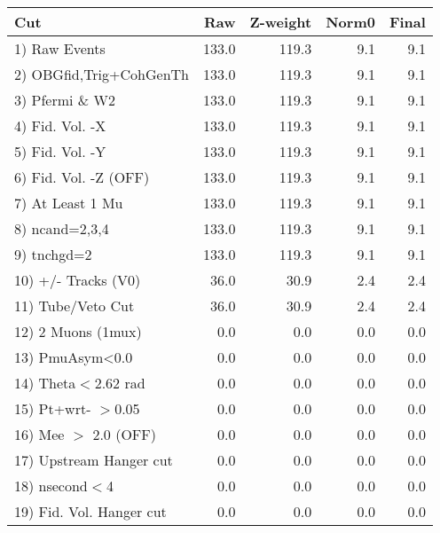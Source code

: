  \begin{table}[h!]\centering
 \begin{tabular}{||l||r|r|r|r||}
 \hline
 \hline
 Cut & Raw & Z-weight & Norm0 & Final \\
 \hline
  1) Raw Events           &       133.0 &       119.3 &         9.1 &         9.1 \\
  2) OBGfid,Trig+CohGenTh &       133.0 &       119.3 &         9.1 &         9.1 \\
  3) Pfermi \& W2         &       133.0 &       119.3 &         9.1 &         9.1 \\
  4) Fid. Vol. -X         &       133.0 &       119.3 &         9.1 &         9.1 \\
  5) Fid. Vol. -Y         &       133.0 &       119.3 &         9.1 &         9.1 \\
  6) Fid. Vol. -Z (OFF)   &       133.0 &       119.3 &         9.1 &         9.1 \\
  7) At Least 1 Mu        &       133.0 &       119.3 &         9.1 &         9.1 \\
  8) ncand=2,3,4          &       133.0 &       119.3 &         9.1 &         9.1 \\
  9) tnchgd=2             &       133.0 &       119.3 &         9.1 &         9.1 \\
 10) +/- Tracks (V0)      &        36.0 &        30.9 &         2.4 &         2.4 \\
 11) Tube/Veto Cut        &        36.0 &        30.9 &         2.4 &         2.4 \\
 12) 2 Muons (1mux)       &         0.0 &         0.0 &         0.0 &         0.0 \\
 13) PmuAsym<0.0          &         0.0 &         0.0 &         0.0 &         0.0 \\
 14) Theta$<$2.62 rad     &         0.0 &         0.0 &         0.0 &         0.0 \\
 15) Pt+wrt- $>$0.05      &         0.0 &         0.0 &         0.0 &         0.0 \\
 16) Mee $>$ 2.0  (OFF)   &         0.0 &         0.0 &         0.0 &         0.0 \\
 17) Upstream Hanger cut  &         0.0 &         0.0 &         0.0 &         0.0 \\
 18) nsecond$<$4          &         0.0 &         0.0 &         0.0 &         0.0 \\
 19) Fid. Vol. Hanger cut &         0.0 &         0.0 &         0.0 &         0.0 \\

\end{tabular}
\end{table}
